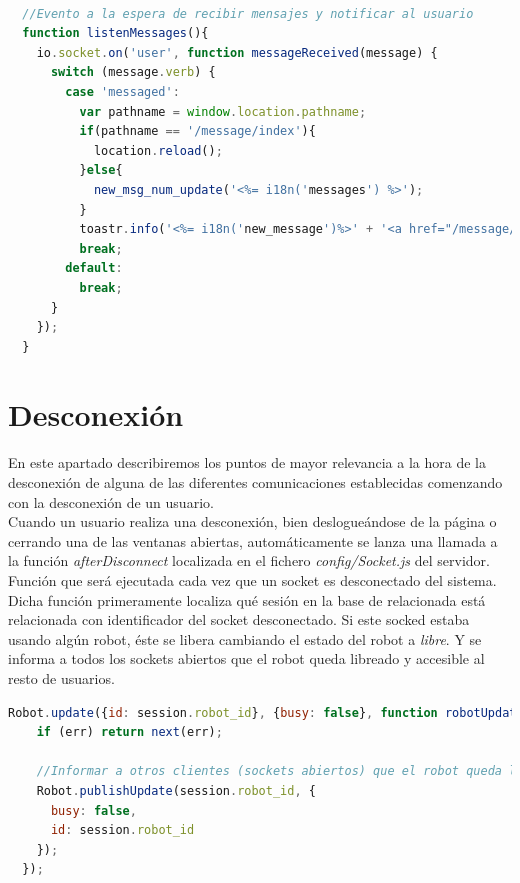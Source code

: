 \begin{lstlisting}[language=JavaScript]

  //Evento a la espera de recibir mensajes y notificar al usuario
  function listenMessages(){
    io.socket.on('user', function messageReceived(message) {
      switch (message.verb) {
        case 'messaged':
          var pathname = window.location.pathname;
          if(pathname == '/message/index'){
            location.reload();
          }else{
            new_msg_num_update('<%= i18n('messages') %>');
          }
          toastr.info('<%= i18n('new_message')%>' + '<a href="/message/index"> <%= i18n('open_here')%> </a>' , 'RobotUI');
          break;
        default:
          break;
      }
    });
  }
\end{lstlisting}



\section { Desconexión }
\label{sec:deconexion}

En este apartado describiremos los puntos de mayor relevancia a la hora de la desconexión de alguna de las diferentes comunicaciones establecidas comenzando con la desconexión de un usuario.\\

Cuando un usuario realiza una desconexión, bien deslogueándose de la página o cerrando una de las ventanas abiertas, automáticamente se lanza una llamada a la 
función \emph{afterDisconnect} localizada en el fichero \emph{config/Socket.js} del servidor. Función que será ejecutada cada vez que un socket es desconectado del sistema.\\

Dicha función primeramente localiza qué sesión en la base de relacionada está relacionada con identificador del socket desconectado. Si este socked estaba usando algún robot, éste se libera cambiando el estado
del robot a \emph{libre}. Y se informa a todos los sockets abiertos que el robot queda libreado y accesible al resto de usuarios.\\

\begin{lstlisting}[language=JavaScript]
  Robot.update({id: session.robot_id}, {busy: false}, function robotUpdated(err) {
    if (err) return next(err);

    //Informar a otros clientes (sockets abiertos) que el robot queda liberado
    Robot.publishUpdate(session.robot_id, {
      busy: false,
      id: session.robot_id
    });
  });
\end{lstlisting}


